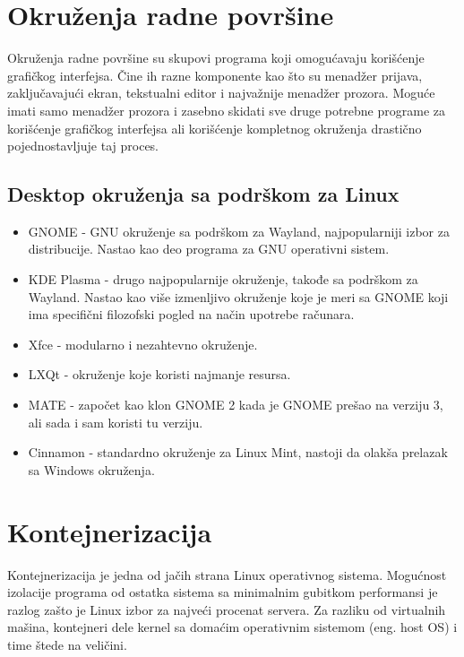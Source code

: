 \documentclass[a4paper,14pt]{article}
\begin{document}
\section{Okruženja radne površine}
Okruženja radne površine su skupovi programa koji omogućavaju korišćenje grafičkog interfejsa. Čine ih razne komponente kao što su menadžer prijava, zaključavajući ekran, tekstualni editor i najvažnije menadžer prozora. Moguće imati samo menadžer prozora i zasebno skidati sve druge potrebne programe za korišćenje grafičkog interfejsa ali korišćenje kompletnog okruženja drastično pojednostavljuje taj proces.
\subsection{Desktop okruženja sa podrškom za Linux}
\begin{itemize}
\item GNOME\cite{gnome} - GNU okruženje sa podrškom za Wayland, najpopularniji izbor za distribucije. Nastao kao deo programa za GNU operativni sistem.
\item KDE Plasma\cite{kdeplasma}  - drugo najpopularnije okruženje, takođe sa podrškom za Wayland. Nastao kao više izmenljivo okruženje koje je meri sa GNOME koji ima specifični filozofski pogled na način upotrebe računara.
\item Xfce\cite{xfce} - modularno i nezahtevno okruženje.
\item LXQt\cite{lxqt} - okruženje koje koristi najmanje resursa.
\item MATE\cite{mate} - započet kao klon GNOME 2 kada je GNOME prešao na verziju 3, ali sada i sam koristi tu verziju.
\item Cinnamon\cite{cinnamon} - standardno okruženje za Linux Mint, nastoji da olakša prelazak sa Windows okruženja.
\end{itemize}
\newpage

\section{Kontejnerizacija}
Kontejnerizacija je jedna od jačih strana Linux operativnog sistema. Mogućnost izolacije programa od ostatka sistema sa minimalnim gubitkom performansi je razlog zašto je Linux izbor za najveći procenat servera. Za razliku od virtualnih mašina, kontejneri dele kernel sa domaćim operativnim sistemom (eng. host OS) i time štede na veličini.
\end{document}
